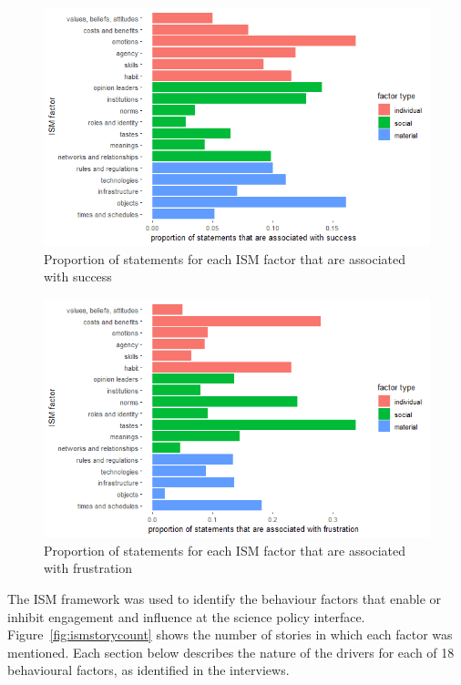 \begin{figure}[!ht]
    \centering
    \includegraphics[width=1\linewidth]{figures/statements_associated_with_success.png}
    \caption{Proportion of statements for each ISM factor that are associated with success}
    \label{fig:ismsuccess}
\end{figure}

\begin{figure}[!ht]
    \centering
    \includegraphics[width=1\linewidth]{figures/statements_associated_with_frustration.png}
    \caption{Proportion of statements for each ISM factor that are associated with frustration}
    \label{fig:ismfrustration}
\end{figure}

The ISM framework was used to identify the behaviour factors that enable or inhibit engagement and influence at the science policy interface. Figure~\ref{fig:ismstorycount} shows the number of stories in which each factor was mentioned. Each section below describes the nature of the drivers for each of 18 behavioural factors, as identified in the interviews.


